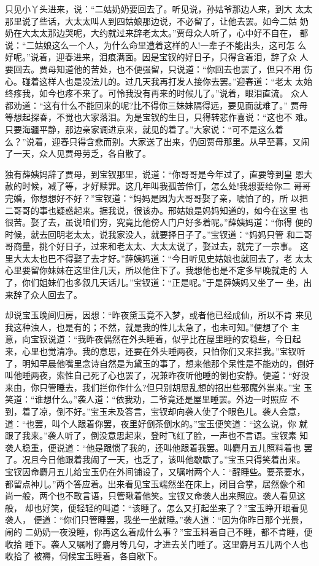 只见小丫头进来，说：“二姑奶奶要回去了。听见说，孙姑爷那边人来，到大
太太那里说了些话，大太太叫人到四姑娘那边说，不必留了，让他去罢。如今二姑
奶奶在大太太那边哭呢，大约就过来辞老太太。”贾母众人听了，心中好不自在，
都说：“二姑娘这么一个人，为什么命里遭着这样的人!一辈子不能出头，这可怎
么好呢。”说着，迎春进来，泪痕满面。因是宝钗的好日子，只得含着泪，辞了众
人要回去。贾母知道他的苦处，也不便强留，只说道：“你回去也罢了，但只不用
伤心。碰着这样人也是没法儿的。过几天我再打发人接你去罢。”迎春道：“老太
太始终疼我，如今也疼不来了。可怜我没有再来的时候儿了。”说着，眼泪直流。
众人都劝道：“这有什么不能回来的呢?比不得你三妹妹隔得远，要见面就难了。”
贾母等想起探春，不觉也大家落泪。为是宝钗的生日，只得转悲作喜说：“这也不
难。只要海疆平静，那边亲家调进京来，就见的着了。”大家说：“可不是这么着
么？”说着，迎春只得含悲而别。大家送了出来，仍回贾母那里。从早至暮，又闹
了一天，众人见贾母劳乏，各自散了。

独有薛姨妈辞了贾母，到宝钗那里，说道：“你哥哥是今年过了，直要等到皇
恩大赦的时候，减了等，才好赎罪。这几年叫我孤苦伶仃，怎么处!我想要给你二
哥哥完婚，你想想好不好？”宝钗道：“妈妈是因为大哥哥娶了亲，唬怕了的，所
以把二哥哥的事也疑惑起来。据我说，很该办。邢姑娘是妈妈知道的，如今在这里
也很苦。娶了去，虽说咱们穷，究竟比他傍人门户好多着呢。”薛姨妈道：“你得
便的时候，就去回明老太太，说我家没人，就要择日子了。”宝钗道：“妈妈只管
和二哥哥商量，挑个好日子，过来和老太太、大太太说了，娶过去，就完了一宗事。
这里大太太也巴不得娶了去才好。”薛姨妈道：“今日听见史姑娘也就回去了，老
太太心里要留你妹妹在这里住几天，所以他住下了。我想他也是不定多早晚就走的
人了，你们姐妹们也多叙几天话儿。”宝钗道：“正是呢。”于是薛姨妈又坐了一
坐，出来辞了众人回去了。

却说宝玉晚间归房，因想：“昨夜黛玉竟不入梦，或者他已经成仙，所以不肯
来见我这种浊人，也是有的；不然，就是我的性儿太急了，也未可知。”便想了个
主意，向宝钗说道：“我昨夜偶然在外头睡着，似乎比在屋里睡的安稳些，今日起
来，心里也觉清净。我的意思，还要在外头睡两夜，只怕你们又来拦我。”宝钗听
了，明知早晨他嘴里念诗自然是为黛玉的事了，想来他那个呆性是不能劝的，倒好
叫他睡两夜，索性自己死了心也罢了，况兼昨夜听他睡的倒也安静。便道：“好没
来由，你只管睡去，我们拦你作什么?但只别胡思乱想的招出些邪魔外祟来。”宝
玉笑道：“谁想什么。”袭人道：“依我劝，二爷竟还是屋里睡罢。外边一时照应
不到，着了凉，倒不好。”宝玉未及答言，宝钗却向袭人使了个眼色儿。袭人会意，
道：“也罢，叫个人跟着你罢，夜里好倒茶倒水的。”宝玉便笑道：“这么说，你
就跟了我来。”袭人听了，倒没意思起来，登时飞红了脸，一声也不言语。宝钗素
知袭人稳重，便说道：“他是跟惯了我的，还叫他跟着我罢。叫麝月五儿照料着也
罢了。况且今日他跟着我闹了一天，也乏了，该叫他歇歇了。”宝玉只得笑着出来。
宝钗因命麝月五儿给宝玉仍在外间铺设了，又嘱咐两个人：“醒睡些。要茶要水，
都留点神儿。”两个答应着。出来看见宝玉端然坐在床上，闭目合掌，居然像个和
尚一般，两个也不敢言语，只管瞅着他笑。宝钗又命袭人出来照应。袭人看见这般，
却也好笑，便轻轻的叫道：“该睡了。怎么又打起坐来了？”宝玉睁开眼看见袭人，
便道：“你们只管睡罢，我坐一坐就睡。”袭人道：“因为你昨日那个光景，闹的
二奶奶一夜没睡，你再这么着成什么事？”宝玉料着自己不睡，都不肯睡，便收拾
睡下。袭人又嘱咐了麝月等几句，才进去关门睡了。这里麝月五儿两个人也收拾了
被褥，伺候宝玉睡着，各自歇下。

